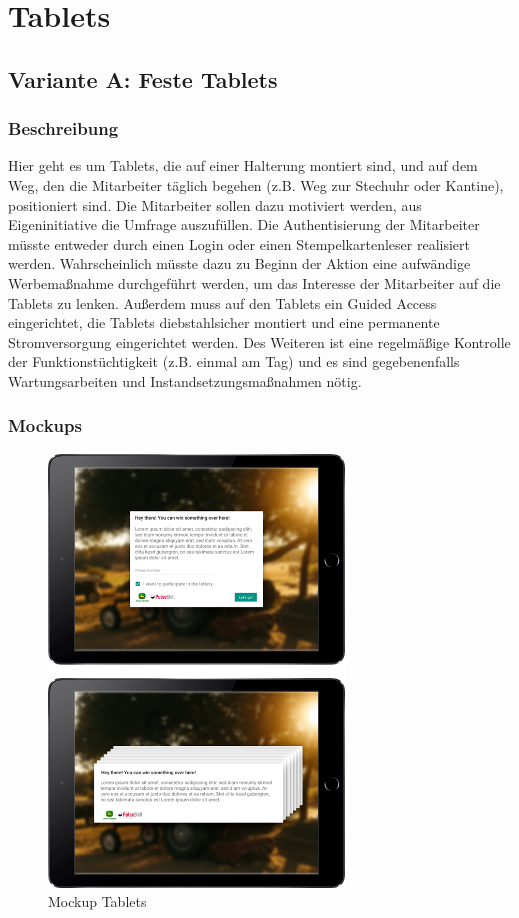 \section{Tablets}
\label{section:tablets}

\subsection{Variante A: Feste Tablets}
\subsubsection{Beschreibung}
Hier geht es um Tablets, die auf einer Halterung montiert sind, und auf dem Weg, den die Mitarbeiter täglich begehen (z.B. Weg zur Stechuhr oder Kantine), positioniert sind. Die Mitarbeiter sollen dazu motiviert werden, aus Eigeninitiative die Umfrage auszufüllen. Die Authentisierung der Mitarbeiter müsste entweder durch einen Login oder einen Stempelkartenleser realisiert werden. Wahrscheinlich müsste dazu zu Beginn der Aktion eine aufwändige Werbemaßnahme durchgeführt werden, um das Interesse der Mitarbeiter auf die Tablets zu lenken. Außerdem muss auf den Tablets ein Guided Access eingerichtet, die Tablets diebstahlsicher montiert und eine permanente Stromversorgung eingerichtet werden. Des Weiteren ist eine regelmäßige Kontrolle der Funktionstüchtigkeit (z.B. einmal am Tag) und es sind gegebenenfalls Wartungsarbeiten und Instandsetzungsmaßnahmen nötig.

\subsubsection{Mockups}
 
\begin{figure}[H]
\centering
\includegraphics[width=0.7\textwidth]{images/portfolio/tablets}
\caption[Mockup Tablets]{Mockup Tablets}
\label{fig:portfolio:tablets}
\end{figure}
 
